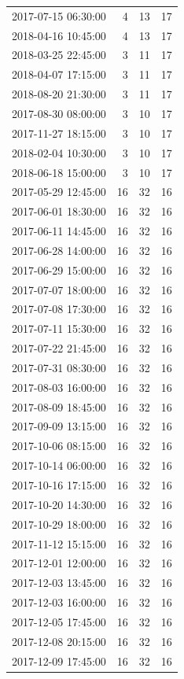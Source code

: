 \begin{tabular}{lrrr}
2017-07-15 06:30:00 & 4 & 13 & 17 \\
2018-04-16 10:45:00 & 4 & 13 & 17 \\
2018-03-25 22:45:00 & 3 & 11 & 17 \\
2018-04-07 17:15:00 & 3 & 11 & 17 \\
2018-08-20 21:30:00 & 3 & 11 & 17 \\
2017-08-30 08:00:00 & 3 & 10 & 17 \\
2017-11-27 18:15:00 & 3 & 10 & 17 \\
2018-02-04 10:30:00 & 3 & 10 & 17 \\
2018-06-18 15:00:00 & 3 & 10 & 17 \\
2017-05-29 12:45:00 & 16 & 32 & 16 \\
2017-06-01 18:30:00 & 16 & 32 & 16 \\
2017-06-11 14:45:00 & 16 & 32 & 16 \\
2017-06-28 14:00:00 & 16 & 32 & 16 \\
2017-06-29 15:00:00 & 16 & 32 & 16 \\
2017-07-07 18:00:00 & 16 & 32 & 16 \\
2017-07-08 17:30:00 & 16 & 32 & 16 \\
2017-07-11 15:30:00 & 16 & 32 & 16 \\
2017-07-22 21:45:00 & 16 & 32 & 16 \\
2017-07-31 08:30:00 & 16 & 32 & 16 \\
2017-08-03 16:00:00 & 16 & 32 & 16 \\
2017-08-09 18:45:00 & 16 & 32 & 16 \\
2017-09-09 13:15:00 & 16 & 32 & 16 \\
2017-10-06 08:15:00 & 16 & 32 & 16 \\
2017-10-14 06:00:00 & 16 & 32 & 16 \\
2017-10-16 17:15:00 & 16 & 32 & 16 \\
2017-10-20 14:30:00 & 16 & 32 & 16 \\
2017-10-29 18:00:00 & 16 & 32 & 16 \\
2017-11-12 15:15:00 & 16 & 32 & 16 \\
2017-12-01 12:00:00 & 16 & 32 & 16 \\
2017-12-03 13:45:00 & 16 & 32 & 16 \\
2017-12-03 16:00:00 & 16 & 32 & 16 \\
2017-12-05 17:45:00 & 16 & 32 & 16 \\
2017-12-08 20:15:00 & 16 & 32 & 16 \\
2017-12-09 17:45:00 & 16 & 32 & 16 \\

\end{tabular}
